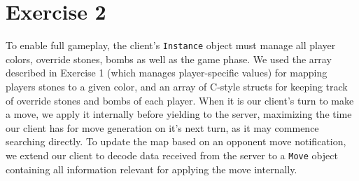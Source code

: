 \section{Exercise 2}

To enable full gameplay, the client's \texttt{Instance} object must manage all player colors, override stones, bombs as well as the game phase. We used the array described in Exercise 1 (which manages player-specific values) for mapping players stones to a given color, and an array of C-style structs for keeping track of override stones and bombs of each player. When it is our client's turn to make a move, we apply it internally before yielding to the server, maximizing the time our client has for move generation on it's next turn, as it may commence searching directly. To update the map based on an opponent move notification, we extend our client to decode data received from the server to a \texttt{Move} object containing all information relevant for applying the move internally.
